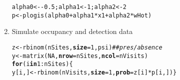 \documentclass[color=usenames,dvipsnames]{beamer}\usepackage[]{graphicx}\usepackage[]{xcolor}
\makeatletter
\newcommand{\hlnum}[1]{\textcolor[rgb]{0.69,0.494,0}{#1}}%
\newcommand{\hlcom}[1]{\textcolor[rgb]{0.514,0.506,0.514}{\textit{#1}}}%
\newcommand{\hlopt}[1]{\textcolor[rgb]{0,0,0}{#1}}%
\newcommand{\hldef}[1]{\textcolor[rgb]{0,0,0}{#1}}%
\newcommand{\hlkwa}[1]{\textcolor[rgb]{0,0,0}{\textbf{#1}}}%
\newcommand{\hlkwb}[1]{\textcolor[rgb]{0,0.341,0.682}{#1}}%
\newcommand{\hlkwc}[1]{\textcolor[rgb]{0,0,0}{\textbf{#1}}}%
\newcommand{\hlkwd}[1]{\textcolor[rgb]{0.004,0.004,0.506}{#1}}%
\newenvironment{kframe}{%
 \def\at@end@of@kframe{}%
 \ifinner\ifhmode%
  \def\at@end@of@kframe{\end{minipage}}%
  \begin{minipage}{\columnwidth}%
 \fi\fi%
 \def\FrameCommand##1{\hskip\@totalleftmargin \hskip-\fboxsep
 \colorbox{shadecolor}{##1}\hskip-\fboxsep
     \hskip-\linewidth \hskip-\@totalleftmargin \hskip\columnwidth}%
 \MakeFramed {\advance\hsize-\width
   \@totalleftmargin\z@ \linewidth\hsize
   \@setminipage}}%
 {\par\unskip\endMakeFramed%
 \at@end@of@kframe}
\newenvironment{knitrout}{}{} %
\makeatother
\begin{document}
\begin{frame}[fragile]
\begin{enumerate}[<+->]
\begin{knitrout}
\begin{kframe}
\begin{alltt}
\hldef{alpha0} \hlkwb{<-} \hlopt{-}\hlnum{0.5}\hldef{; alpha1} \hlkwb{<-} \hlnum{1}\hldef{; alpha2} \hlkwb{<-} \hlnum{2}
\hldef{p} \hlkwb{<-} \hlkwd{plogis}\hldef{(alpha0} \hlopt{+} \hldef{alpha1}\hlopt{*}\hldef{x1} \hlopt{+} \hldef{alpha2}\hlopt{*}\hldef{wHot)}
\end{alltt}
\end{kframe}
\end{knitrout}
  \item Simulate occupancy and detection data
\begin{knitrout}\scriptsize
{}\color{fgcolor}\begin{kframe}
\begin{alltt}
\hldef{z} \hlkwb{<-} \hlkwd{rbinom}\hldef{(nSites,} \hlkwc{size}\hldef{=}\hlnum{1}\hldef{, psi)}            \hlcom{## pres/absence}
\hldef{y} \hlkwb{<-} \hlkwd{matrix}\hldef{(}\hlnum{NA}\hldef{,} \hlkwc{nrow}\hldef{=nSites,} \hlkwc{ncol}\hldef{=nVisits)}
\hlkwa{for}\hldef{(i} \hlkwa{in} \hlnum{1}\hlopt{:}\hldef{nSites) \{}
    \hldef{y[i,]} \hlkwb{<-} \hlkwd{rbinom}\hldef{(nVisits,} \hlkwc{size}\hldef{=}\hlnum{1}\hldef{,} \hlkwc{prob}\hldef{=z[i]}\hlopt{*}\hldef{p[i,]) \}}
\end{alltt}
\end{kframe}
\end{knitrout}
\end{enumerate}
\end{frame}
\end{document}

